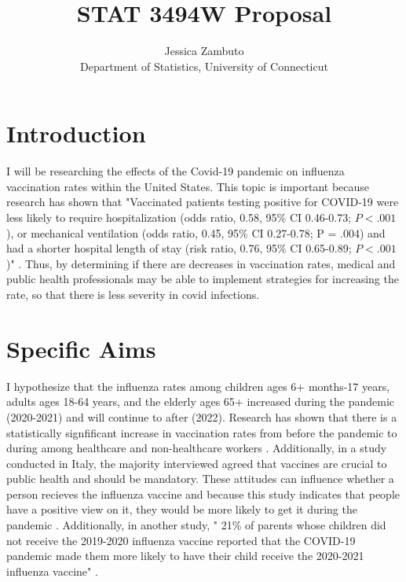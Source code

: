 \documentclass[12pt]{article}
\title{STAT 3494W Proposal}
\author{Jessica Zambuto\\
Department of Statistics, University of Connecticut}
\begin{document}
\maketitle

\section{Introduction}
\label{sec:intro}
I will be researching the effects of the Covid-19 pandemic on influenza vaccination rates within the United States. This topic
is important because research has shown that "Vaccinated patients testing positive for COVID-19 were less likely to require hospitalization 
(odds ratio, 0.58, 95\% CI 0.46-0.73; $P< .001$), or mechanical ventilation (odds ratio, 0.45, 95\% CI 0.27-0.78; P = .004) and had a shorter 
hospital length of stay (risk ratio, 0.76, 95\% CI 0.65-0.89; $P< .001$)" \citep{conlon2021impact}. Thus, by determining if there are decreases
in vaccination rates, medical and public health professionals may be able to implement strategies for increasing the rate, so that there is less 
severity in covid infections.  

\section{Specific Aims}
\label{sec:aims}
I hypothesize that the influenza rates among children ages 6+ months-17 years, adults ages 18-64 years, and the elderly ages 65+ increased during 
the pandemic (2020-2021) and will continue to after (2022). Research has shown that there is a statistically signfificant increase in vaccination 
rates from before the pandemic to during among healthcare and non-healthcare workers \citep{conlon2021impact}. Additionally, in a study conducted 
in Italy, the majority interviewed agreed that vaccines are crucial to public health and should be mandatory. These attitudes can influence whether
a person recieves the influenza vaccine and because this study indicates that people have a positive view on it, they would be more likely to 
get it during the pandemic \citep{domnich2020attitudes}. Additionally, in another study, " 21\% of parents whose children did not receive the 2019-2020 
influenza vaccine reported that the COVID-19 pandemic made them more likely to have their child receive the 2020-2021 influenza vaccine" \citep{sokol2020covid}.
\end{document}
